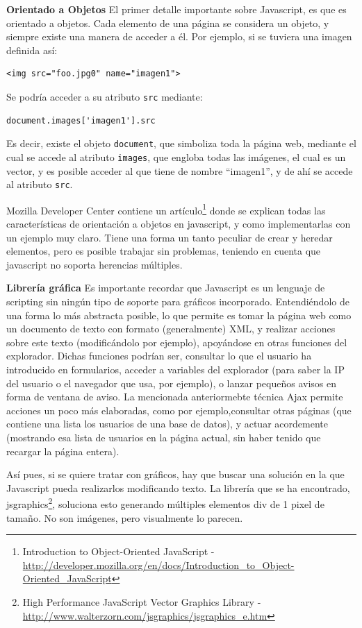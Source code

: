 \textbf{Orientado a Objetos}
El primer detalle importante sobre Javascript, es que es orientado a objetos. Cada elemento de una página se considera un objeto, y siempre existe una manera de acceder a él. Por ejemplo, si se tuviera una imagen definida así:
\begin{verbatim}
<img src="foo.jpg0" name="imagen1">
\end{verbatim}

Se podría acceder a su atributo \texttt{src} mediante:

\begin{verbatim}
document.images['imagen1'].src
\end{verbatim}

Es decir, existe el objeto \texttt{document}, que simboliza toda la página web, mediante el cual se accede al atributo \texttt{images}, que engloba todas las imágenes, el cual es un vector, y es posible acceder al que tiene de nombre ``imagen1'', y de ahí se accede al atributo \texttt{src}.

Mozilla Developer Center contiene un artículo\footnote{Introduction to Object-Oriented JavaScript - \url{http://developer.mozilla.org/en/docs/Introduction_to_Object-Oriented_JavaScript}} donde se explican todas las características de orientación a objetos en javascript, y como implementarlas con un ejemplo muy claro. Tiene una forma un tanto peculiar de crear y heredar elementos, pero es posible trabajar sin problemas, teniendo en cuenta que javascript no soporta herencias múltiples.

\textbf{Librería gráfica}
Es importante recordar que Javascript es un lenguaje de scripting sin ningún tipo de soporte para gráficos incorporado. Entendiéndolo de una forma lo más abstracta posible, lo que permite es tomar la página web como un documento de texto con formato (generalmente) XML, y realizar acciones sobre este texto (modificándolo por ejemplo), apoyándose en otras funciones del explorador. Dichas funciones podrían ser, consultar lo que el usuario ha introducido en formularios, acceder a variables del explorador (para saber la IP del usuario o el navegador que usa, por ejemplo), o lanzar pequeños avisos en forma de ventana de aviso. La mencionada anteriormebte técnica Ajax permite acciones un poco más elaboradas, como por ejemplo,consultar otras páginas (que contiene una lista los usuarios de una base de datos), y actuar acordemente (mostrando esa lista de usuarios en la página actual, sin haber tenido que recargar la página entera).

Así pues, si se quiere tratar con gráficos, hay que buscar una solución en la que Javascript pueda realizarlos modificando texto. La librería que se ha encontrado, jsgraphics\footnote{High Performance JavaScript Vector Graphics Library - \url{http://www.walterzorn.com/jsgraphics/jsgraphics_e.htm}}, soluciona esto generando múltiples elementos div de 1 pixel de tamaño. No son imágenes, pero visualmente lo parecen.

